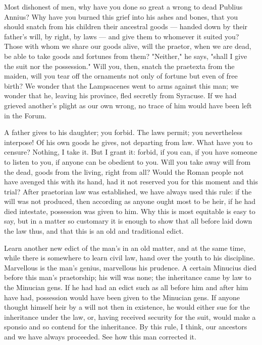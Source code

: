  Most dishonest of men, why have you done so great a wrong to dead Publius Annius? Why have you burned this grief into his ashes and bones, that you should snatch from his children their ancestral goods --- handed down by their father's will, by right, by laws --- and give them to whomever it suited you? Those with whom we share our goods alive, will the praetor, when we are dead, be able to take goods and fortunes from them? "Neither," he says, "shall I give the suit nor the possession." Will you, then, snatch the praetexta from the maiden, will you tear off the ornaments not only of fortune but even of free birth? We wonder that the Lampsacenes went to arms against this man; we wonder that he, leaving his province, fled secretly from Syracuse. If we had grieved another's plight as our own wrong, no trace of him would have been left in the Forum.

 A father gives to his daughter; you forbid. The laws permit; you nevertheless interpose! Of his own goods he gives, not departing from law. What have you to censure? Nothing, I take it. But I grant it: forbid, if you can, if you have someone to listen to you, if anyone can be obedient to you. Will you take away will from the dead, goods from the living, right from all? Would the Roman people not have avenged this with its hand, had it not reserved you for this moment and this trial? After praetorian law was established, we have always used this rule: if the will was not produced, then according as anyone ought most to be heir, if he had died intestate, possession was given to him. Why this is most equitable is easy to say, but in a matter so customary it is enough to show that all before laid down the law thus, and that this is an old and traditional edict.

 Learn another new edict of the man's in an old matter, and at the same time, while there is somewhere to learn civil law, hand over the youth to his discipline. Marvellous is the man's genius, marvellous his prudence. A certain Minucius died before this man's praetorship; his will was none; the inheritance came by law to the Minucian gens. If he had had an edict such as all before him and after him have had, possession would have been given to the Minucian gens. If anyone thought himself heir by a will not then in existence, he would either sue for the inheritance under the law, or, having received security for the suit, would make a sponsio and so contend for the inheritance. By this rule, I think, our ancestors and we have always proceeded. See how this man corrected it.

